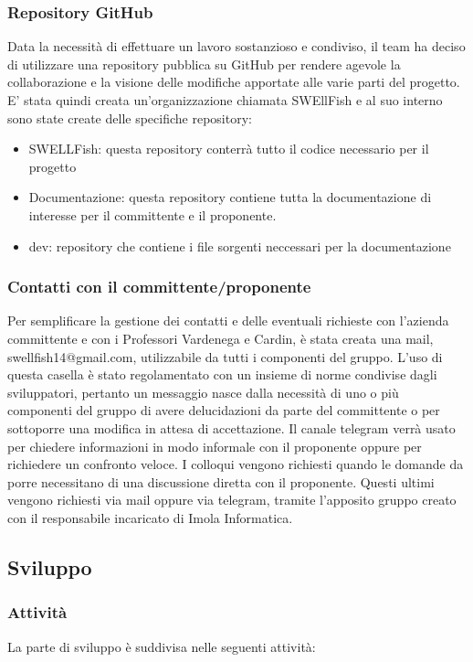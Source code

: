 \documentclass[12pt]{article}
\begin{document}
\subsubsection{Repository GitHub}
Data la necessità di effettuare un lavoro sostanzioso e condiviso, il team ha deciso di utilizzare una repository pubblica su GitHub per rendere agevole la collaborazione e la visione delle modifiche apportate alle varie parti del progetto.
E' stata quindi creata un'organizzazione chiamata SWEllFish e al suo interno sono state create delle specifiche repository:

\begin{itemize}
    \item SWELLFish: questa repository conterrà tutto il codice necessario per il progetto
    \item Documentazione: questa repository contiene tutta la documentazione di interesse per il committente e il proponente.
    \item dev: repository che contiene i file sorgenti neccessari per la documentazione
\end{itemize}

\subsubsection{Contatti con il committente/proponente}
Per semplificare la gestione dei contatti e delle eventuali richieste con l'azienda committente e con i Professori Vardenega e Cardin, è stata creata una mail, swellfish14@gmail.com, utilizzabile da tutti i componenti del gruppo.
L'uso di questa casella è stato regolamentato con un insieme di norme condivise dagli sviluppatori, pertanto un messaggio nasce dalla necessità di uno o più componenti del gruppo di avere delucidazioni da parte del committente o per sottoporre una modifica in attesa di accettazione.
Il canale telegram verrà usato per chiedere informazioni in modo informale con il proponente oppure per richiedere un confronto veloce.
I colloqui vengono richiesti quando le domande da porre necessitano di una discussione diretta con il proponente.
Questi ultimi vengono richiesti via mail oppure via telegram, tramite l'apposito gruppo creato con il responsabile incaricato di Imola Informatica.

\subsection{Sviluppo}
\subsubsection{Attività}
La parte di sviluppo è suddivisa nelle seguenti attività:
\end{document}
